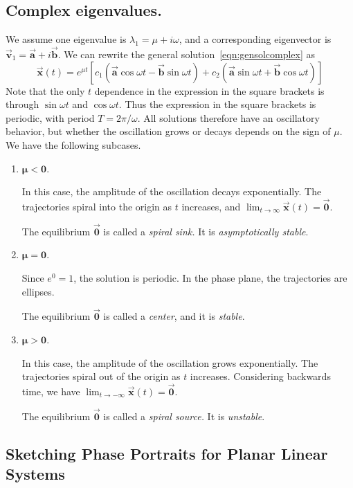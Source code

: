 \documentclass[reqno]{immbook}
\newcommand{\BA}{\vec{\textbf{a}}}
\newcommand{\BB}{\vec{\textbf{b}}}
\newcommand{\BV}{\vec{\textbf{v}}}
\newcommand{\BX}{\vec{\textbf{x}}}
\newcommand{\BZero}{\vec{\textbf{0}}}  %
\newcommand{\ds}{\displaystyle}
\numberwithin{equation}{chapter}
\numberwithin{question}{section}
\numberwithin{theorem}{chapter}
\numberwithin{figure}{chapter}
\theoremstyle{definition}
\begin{document}
\subsection*{Complex eigenvalues.}
We assume one eigenvalue is $\lambda_1 = \mu + i\omega$,
and a corresponding eigenvector is
$\BV_1 = \BA+i\BB$.
We can rewrite the general solution~\eqref{eqn:gensolcomplex}
as
\begin{equation}
\BX(t) = 
     e^{\mu t} \left[ c_1 \left(\BA\cos\omega t - \BB\sin\omega t \right)
         + c_2 \left(\BA\sin\omega t + \BB\cos\omega t\right)\right]
\end{equation}
Note that the only $t$ dependence in the expression in the square
brackets is through $\sin\omega t$ and $\cos\omega t$.
Thus the expression in the square brackets is periodic, with
period $T = 2\pi/\omega$.
All solutions therefore have an oscillatory behavior, 
but whether the oscillation grows or decays depends on the
sign of $\mu$.
We have the following subcases.
\begin{enumerate}

\item $\pmb{\mu < 0}$.

In this case, the amplitude of the oscillation decays
exponentially.
The trajectories spiral into the origin as $t$ increases,
and $\ds\lim_{t\rightarrow\infty} \BX(t) = \BZero$.

The equilibrium $\BZero$ is called a \emph{spiral sink.}
It is \emph{asymptotically stable}.

\item $\pmb{\mu = 0}$.

Since $e^{0}=1$, the solution is periodic.
In the phase plane, the trajectories are ellipses.

The equilibrium $\BZero$ is called a \emph{center}, and it is
\emph{stable}.

\item $\pmb{\mu > 0}$.

In this case, the amplitude of the oscillation grows
exponentially.
The trajectories spiral out of the origin as $t$ increases.
Considering backwards time, we have
$\ds \lim_{t\rightarrow-\infty} \BX(t) = \BZero$.

The equilibrium $\BZero$ is called a \emph{spiral source.}
It is \emph{unstable}.
\end{enumerate}

\subsection*{Sketching Phase Portraits for Planar Linear Systems}
\end{document}
